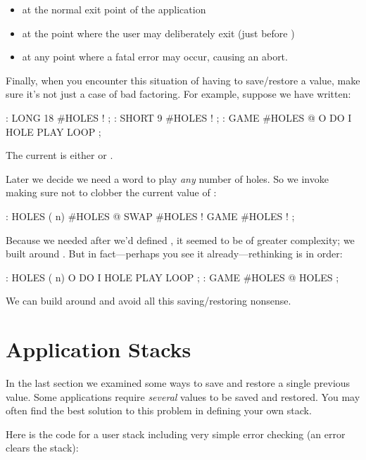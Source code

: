 \begin{itemize}
\item at the normal exit point of the application
\item at the point where the user may deliberately exit (just before
)
\item at any point where a fatal error may occur, causing an abort.
\end{itemize}

Finally, when you encounter this situation of having to save/restore a
value, make sure it's not just a case of bad factoring. For example,
suppose we have written:

\begin{Code}
: LONG   18 #HOLES ! ;
: SHORT   9 #HOLES ! ;
: GAME   #HOLES @  O DO  I HOLE PLAY  LOOP ;
\end{Code}
The current  is either  or .

Later we decide we need a word to play \emph{any} number of holes. So
we invoke  making sure not to clobber the current value of
:

\begin{Code}
: HOLES  ( n)  #HOLES @  SWAP #HOLES !  GAME  #HOLES ! ;
\end{Code}
Because we needed  after we'd defined , it
seemed to be of greater complexity; we built  around
. But in fact---perhaps you see it already---rethinking is
in order:

\begin{Code}
: HOLES ( n)  O DO  I HOLE PLAY  LOOP ;
: GAME   #HOLES @ HOLES ;
\end{Code}
We can build  around  and avoid all this
saving/restoring nonsense.%
%

\section{Application Stacks}

In the last section we examined some ways to save and restore a single
previous value. Some applications require \emph{several} values to be
saved and restored. You may often find the best solution to this problem
in defining your own stack.

Here is the code for a user stack including very simple error checking
(an error clears the stack):

